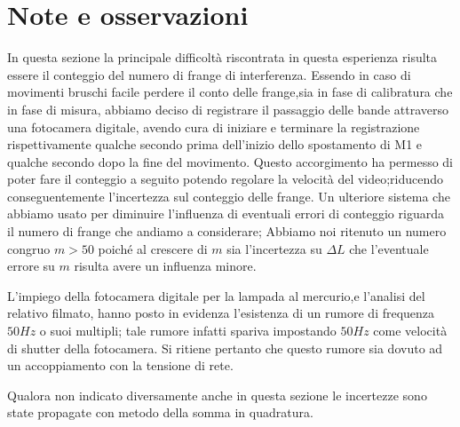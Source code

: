 \section{Note e osservazioni}
In questa sezione la principale difficoltà
riscontrata in questa esperienza risulta essere il conteggio del
numero di frange di interferenza.
Essendo in caso di movimenti bruschi facile
perdere il conto delle frange,sia in fase di 
calibratura che in fase di misura, abbiamo deciso di registrare 
il passaggio delle bande attraverso una fotocamera digitale,
avendo cura di iniziare e terminare la registrazione rispettivamente qualche 
secondo prima dell'inizio dello spostamento di M1
e qualche secondo dopo la fine del movimento.
Questo accorgimento ha permesso di poter fare il conteggio a seguito
potendo regolare la velocità del video;riducendo conseguentemente l'incertezza 
sul conteggio delle frange.
Un ulteriore sistema che abbiamo usato per diminuire l'influenza 
di eventuali errori di conteggio riguarda il numero di frange che andiamo a 
considerare;
Abbiamo noi ritenuto un numero congruo $m> 50$
poiché al crescere di $m$ sia l'incertezza su $\Delta L$ che l'eventuale 
errore su $m$ risulta avere un influenza minore.

L'impiego della fotocamera digitale per la lampada al mercurio,e l'analisi del
relativo filmato, 
hanno posto in evidenza l'esistenza di un rumore di frequenza $50 Hz$ o 
suoi multipli; tale rumore infatti spariva impostando $50 Hz$ come velocità di shutter della fotocamera.
Si ritiene pertanto che questo rumore sia dovuto  ad un accoppiamento con 
la tensione di rete. 

Qualora non indicato diversamente anche in questa sezione le incertezze sono 
state propagate
con metodo della somma in quadratura.